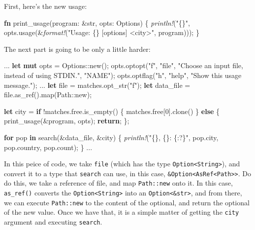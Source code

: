 \documentclass[a4paper,]{book}
\newenvironment{Shaded}{\begin{snugshade}}{\end{snugshade}}
\newcommand{\KeywordTok}[1]{\textcolor[rgb]{0.13,0.29,0.53}{\textbf{{#1}}}}
\newcommand{\DataTypeTok}[1]{\textcolor[rgb]{0.13,0.29,0.53}{{#1}}}
\newcommand{\DecValTok}[1]{\textcolor[rgb]{0.00,0.00,0.81}{{#1}}}
\newcommand{\StringTok}[1]{\textcolor[rgb]{0.31,0.60,0.02}{{#1}}}
\newcommand{\PreprocessorTok}[1]{\textcolor[rgb]{0.56,0.35,0.01}{\textit{{#1}}}}
\newcommand{\NormalTok}[1]{{#1}}
\begin{document}
First, here's the new usage:

\begin{Shaded}
\begin{Highlighting}[]
\KeywordTok{fn} \NormalTok{print_usage(program: &}\DataTypeTok{str}\NormalTok{, opts: Options) \{}
    \PreprocessorTok{println!}\NormalTok{(}\StringTok{"\{\}"}\NormalTok{, opts.usage(&}\PreprocessorTok{format!}\NormalTok{(}\StringTok{"Usage: \{\} [options] <city>"}\NormalTok{, program)));}
\NormalTok{\}}
\end{Highlighting}
\end{Shaded}

The next part is going to be only a little harder:

\begin{Shaded}
\begin{Highlighting}[]
\NormalTok{...}
\KeywordTok{let} \KeywordTok{mut} \NormalTok{opts = Options::new();}
\NormalTok{opts.optopt(}\StringTok{"f"}\NormalTok{, }\StringTok{"file"}\NormalTok{, }\StringTok{"Choose an input file, instead of using STDIN."}\NormalTok{, }\StringTok{"NAME"}\NormalTok{);}
\NormalTok{opts.optflag(}\StringTok{"h"}\NormalTok{, }\StringTok{"help"}\NormalTok{, }\StringTok{"Show this usage message."}\NormalTok{);}
\NormalTok{...}
\KeywordTok{let} \NormalTok{file = matches.opt_str(}\StringTok{"f"}\NormalTok{);}
\KeywordTok{let} \NormalTok{data_file = file.as_ref().map(Path::new);}
    
\KeywordTok{let} \NormalTok{city = }\KeywordTok{if} \NormalTok{!matches.free.is_empty() \{}
    \NormalTok{matches.free[}\DecValTok{0}\NormalTok{].clone()}
\NormalTok{\} }\KeywordTok{else} \NormalTok{\{}
    \NormalTok{print_usage(&program, opts);}
    \KeywordTok{return}\NormalTok{;}
\NormalTok{\};}

\KeywordTok{for} \NormalTok{pop }\KeywordTok{in} \NormalTok{search(&data_file, &city) \{}
    \PreprocessorTok{println!}\NormalTok{(}\StringTok{"\{\}, \{\}: \{:?\}"}\NormalTok{, pop.city, pop.country, pop.count);}
\NormalTok{\}}
\NormalTok{...}
\end{Highlighting}
\end{Shaded}

In this peice of code, we take \texttt{file} (which has the type
\texttt{Option\textless{}String\textgreater{}}), and convert it to a
type that \texttt{search} can use, in this case,
\texttt{\&Option\textless{}AsRef\textless{}Path\textgreater{}\textgreater{}}.
Do do this, we take a reference of file, and map \texttt{Path::new} onto
it. In this case, \texttt{as\_ref()} converts the
\texttt{Option\textless{}String\textgreater{}} into an
\texttt{Option\textless{}\&str\textgreater{}}, and from there, we can
execute \texttt{Path::new} to the content of the optional, and return
the optional of the new value. Once we have that, it is a simple matter
of getting the \texttt{city} argument and executing \texttt{search}.
\end{document}
